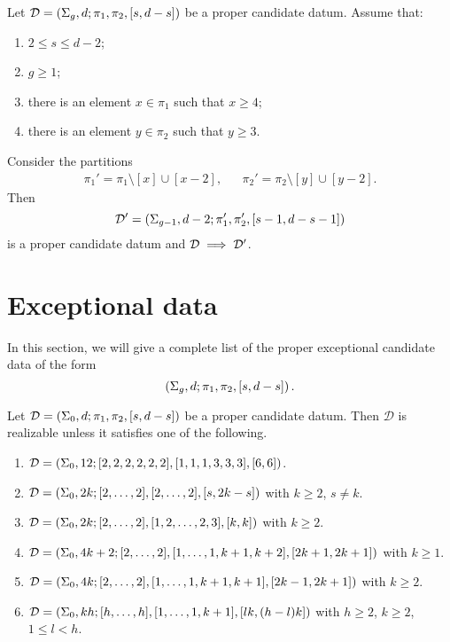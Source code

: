\documentclass{article}
\begin{document}
\begin{combinatorialmove}\label{move:4-3}
Let $\mathcal{D}=\left(\Sigma_g,d;\pi_1,\pi_2,[s,d-s]\right)$ be a proper candidate datum. Assume that:
\begin{enumerate}
\item $2\le s\le d-2$;
\item $g\ge 1$;
\item there is an element $x\in\pi_1$ such that $x\ge 4$;
\item there is an element $y\in\pi_2$ such that $y\ge 3$.
\end{enumerate}
Consider the partitions
\begin{align*}
\pi_1'=\pi_1\setminus[x]\cup[x-2],&&\pi_2'=\pi_2\setminus[y]\cup[y-2].
\end{align*}
Then
\[
\mathcal{D'}=\left(\Sigma_{g-1},d-2;\pi_1',\pi_2',[s-1,d-s-1]\right)
\]
is a proper candidate datum and $\mathcal{D}\implies\mathcal{D}'$.
\end{combinatorialmove}

\section{Exceptional data}
In this section, we will give a complete list of the proper exceptional candidate data of the form
\[
\left(\Sigma_g,d;\pi_1,\pi_2,[s,d-s]\right).
\]

\begin{theorem}\label{th:exceptional-n3-g0}
Let $\mathcal{D}=\left(\Sigma_0,d;\pi_1,\pi_2,[s,d-s]\right)$ be a proper candidate datum. Then $\mathcal{D}$ is realizable unless it satisfies one of the following.
\begin{enumerate}
\item $\mathcal{D}=\left(\Sigma_0,12;[2,2,2,2,2,2],[1,1,1,3,3,3],[6,6]\right)$.
\item $\mathcal{D}=\left(\Sigma_0,2k;[2,\ldots,2],[2,\ldots,2],[s,2k-s]\right)$ with $k\ge 2$, $s\neq k$.
\item $\mathcal{D}=\left(\Sigma_0,2k;[2,\ldots,2],[1,2,\ldots,2,3],[k,k]\right)$ with $k\ge2$.
\item $\mathcal{D}=\left(\Sigma_0,4k+2;[2,\ldots,2],[1,\ldots,1,k+1,k+2],[2k+1,2k+1]\right)$ with $k\ge 1$.
\item $\mathcal{D}=\left(\Sigma_0,4k;[2,\ldots,2],[1,\ldots,1,k+1,k+1],[2k-1,2k+1]\right)$ with $k\ge2$.
\item $\mathcal{D}=\left(\Sigma_0,kh;[h,\ldots,h],[1,\ldots,1,k+1],[lk,(h-l)k]\right)$ with $h\ge 2$, $k\ge 2$, $1\le l<h$.
\end{enumerate}
\end{theorem}
\end{document}
